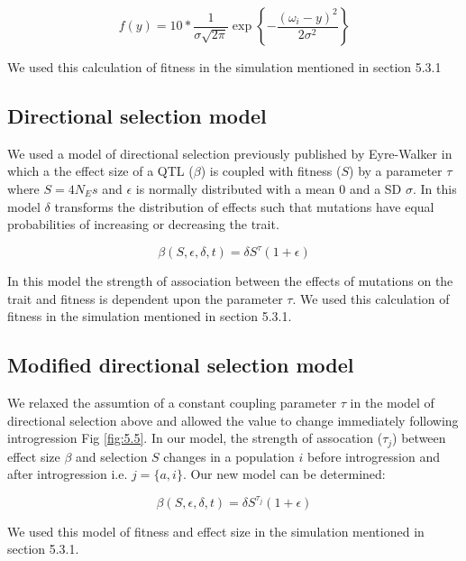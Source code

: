 $$f(y) = 10 * \frac{1}{\sigma\sqrt{2\pi}} \exp{\left\{ -\frac{(\omega_i-y)^2}{2\sigma^2}\right \}}$$

We used this calculation of fitness in the simulation mentioned in section 5.3.1

\subsection{Directional selection model}
We used a model of directional selection previously published by Eyre-Walker \cite{eyre2010genetic} in which a the effect size of a QTL ($\beta$) is coupled with fitness ($S$) by a parameter $\tau$ where $S = 4N_Es$ and $\epsilon$ is normally distributed with a mean 0 and a SD $\sigma$. In this model $\delta$ transforms the distribution of effects such that mutations have equal probabilities of increasing or decreasing the trait.

$$\beta(S,\epsilon,\delta,t) = \delta S^{\tau}(1+\epsilon)$$

In this model the strength of association between the effects of mutations on the trait and fitness is dependent upon the parameter $\tau$. We used this calculation of fitness in the simulation mentioned in section 5.3.1.

\subsection{Modified directional selection model}
We relaxed the assumtion of a constant coupling parameter $\tau$ in the model of directional selection above and allowed the value to change immediately following introgression Fig \ref{fig:5.5}. In our model, the strength of assocation ($\tau_j$) between effect size $\beta$ and selection $S$ changes in a population $i$ before introgression and after introgression i.e. $j = \{a,i\}$. Our new model can be determined:  

$$\beta(S,\epsilon,\delta,t) = \delta S^{\tau_j}(1+\epsilon)$$

We used this model of fitness and effect size in the simulation mentioned in section 5.3.1.

